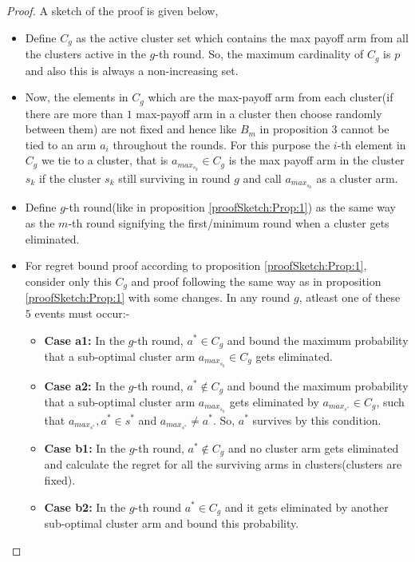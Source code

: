 \begin{proof}
 A sketch of the proof is given below,

\begin{itemize}
\item Define $C_{g}$ as the active cluster set which contains the max payoff arm from all the clusters active in the $g$-th round. So, the maximum cardinality of $C_{g}$ is $p$ and also this is always a non-increasing set.
\item Now, the elements in $C_{g}$ which are the max-payoff arm from each cluster(if there are more than $1$ max-payoff arm in a cluster then choose randomly between them) are not fixed and hence like $B_{m}$ in proposition $3$ cannot be tied to an arm $a_{i}$ throughout the rounds. For this purpose the $i$-th element in $C_{g}$ we tie to a cluster, that is $a_{max_{s_{k}}}\in C_{g}$ is the max payoff arm in the cluster $s_{k}$ if the cluster $s_{k}$ still surviving in round $g$ and call $a_{max_{s_{k}}}$ as a cluster arm. 
\item Define $g$-th round(like in proposition \ref{proofSketch:Prop:1}) as the same way as the $m$-th round signifying the first/minimum round when a cluster gets eliminated.
\item For regret bound proof according to proposition \ref{proofSketch:Prop:1}, consider only this $C_{g}$ and proof following the same way as in proposition \ref{proofSketch:Prop:1} with some changes. In any round $g$, atleast one of these $5$ events must occur:-
\begin{itemize}
\item \textbf{Case a1:} In the $g$-th round, $a^{*}\in C_{g}$ and bound the maximum probability that a sub-optimal cluster arm $a_{max_{s_{k}}}\in C_{g}$ gets eliminated.
\item \textbf{Case a2:} In the $g$-th round, $a^{*}\notin C_{g}$ and bound the maximum probability that a sub-optimal cluster arm $a_{max_{s_{k}}}$ gets eliminated by $a_{max_{s^{*}}}\in C_{g}$, such that $a_{max_{s^{*}}},a^{*}\in s^{*}$ and $a_{max_{s^{*}}}\neq a^{*}$. So, $a^{*}$ survives by this condition.
\item \textbf{Case b1:} In the $g$-th round, $a^{*}\notin C_{g}$ and no cluster arm gets eliminated and calculate the regret for all the surviving arms in clusters(clusters are fixed).
\item \textbf{Case b2:} In the $g$-th round $a^{*}\in C_{g}$ and it gets eliminated by another sub-optimal cluster arm and bound this probability.

\end{itemize}
\end{itemize}
\end{proof}
